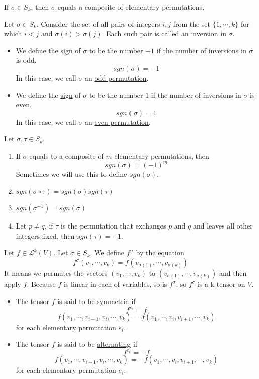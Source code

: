 \begin{lemma}
    If $\sigma\in S_k$, then $\sigma$ equals a composite of elementary permutations.
\end{lemma}

\begin{definition}
    Let $\sigma\in S_k$. Consider the set of all pairs of integers $i,j$ from the set $\{1,\cdots,k\}$ for which $i<j$ and $\sigma(i)>\sigma(j)$. Each such pair is called an inversion in $\sigma$.
    \begin{itemize}
        \item We define the \underline{sign} of $\sigma$ to be the number $-1$ if the number of inversions in $\sigma$ is odd.
        $$sgn(\sigma)=-1$$
        In this case, we call $\sigma$ an \underline{odd permutation}.
        \item We define the \underline{sign} of $\sigma$ to be the number $1$ if the number of inversions in $\sigma$ is even.
        $$sgn(\sigma)=1$$
        In this case, we call $\sigma$ an \underline{even permutation}.
    \end{itemize}
\end{definition}

\begin{lemma}
    Let $\sigma,\tau\in S_k$.
    \begin{enumerate}
        \item If $\sigma$ equals to a composite of $m$ elementary permutations, then $$sgn(\sigma)=(-1)^m$$
        Sometimes we will use this to define $sgn(\sigma)$.
        \item $sgn(\sigma\circ \tau)=sgn(\sigma)sgn(\tau)$
        \item $sgn(\sigma^{-1})=sgn(\sigma)$
        \item Let $p\neq q$, if $\tau$ is the permutation that exchanges $p$ and $q$ and leaves all other integers fixed, then $sgn(\tau)=-1$.
    \end{enumerate}
\end{lemma}

\begin{definition}
    Let $f\in\mathcal{L}^k(V)$. Let $\sigma\in S_k$. We define $f^{\sigma}$ by the equation 
    $$f^{\sigma}(v_1,\cdots,v_k)=f(v_{\sigma(1)},\cdots,v_{\sigma(k)})$$
    It means we permutes the vectors $(v_1,\cdots,v_k)$ to $(v_{\sigma(1)},\cdots,v_{\sigma(k)})$ and then apply $f$. Because $f$ is linear in each of variables, so is $f^{\sigma}$, so $f^{\sigma}$ is a k-tensor on $V$. 
    \begin{itemize}
        \item The tensor $f$ is said to be \underline{symmetric} if $$f^{e_i}=f$$ 
        $$f(v_1,\cdots,v_{i+1},v_i,\cdots,v_k)=f(v_1,\cdots,v_i,v_{i+1},\cdots,v_k)$$
        for each elementary permutation $e_i$.
        \item The tensor $f$ is said to be \underline{alternating} if $$f^{e_i}=-f$$ 
        $$f(v_1,\cdots,v_{i+1},v_i,\cdots,v_k)=-f(v_1,\cdots,v_i,v_{i+1},\cdots,v_k)$$
        for each elementary permutation $e_i$.
    \end{itemize}
\end{definition}

